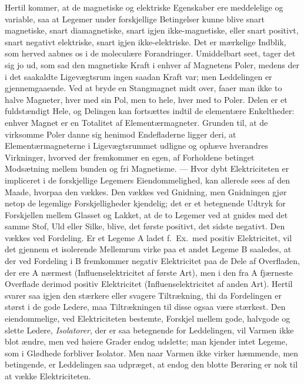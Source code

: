 \documentclass[12pt]{book}
\newcommand{\apage}[1]{\marginnote{\footnotesize\textit{[#1]}}}
\begin{document}
Hertil kommer, at de magnetiske og elektriske Egenskaber ere meddelelige og
variable, saa at  \apage{148} Legemer under forskjellige Betingelser kunne blive snart
magnetiske, snart diamagnetiske, snart igjen ikke-magnetiske, eller snart
positivt, snart negativt elektriske, snart igjen ikke-elektriske. Det er
mærkelige Indblik, som herved aabnes os i de moleculære Forandringer.
Umiddelbart seet, tager det sig jo ud, som sad den magnetiske Kraft i
enhver af Magnetens Poler, medens der i det saakaldte Ligevægtsrum ingen
saadan Kraft var; men Leddelingen er gjennemgaaende. Ved at bryde en
Stangmagnet midt over, faaer man ikke to halve Magneter, hver med sin Pol,
men to hele, hver med to Poler. Delen er et fuldstændigt Hele, og Delingen
kan fortsættes indtil de elementære Enkeltheder: enhver Magnet er en
Totalitet af Elementærmagneter. Grunden til, at de virksomme Poler danne
sig henimod Endefladerne ligger deri, at Elementærmagneterne i
Ligevægtsrummet udligne og ophæve hverandres Virkninger, hvorved der
fremkommer en egen, af Forholdene betinget Modsætning mellem bunden og fri
Magnetisme. --- Hvor dybt Elektriciteten er impliceret i de forskjellige
Legemers Eiendommelighed, kan allerede sees af den Maade, hvorpaa den
vækkes. Den vækkes ved Gnidning, men Gnidningen gjør netop de legemlige
Forskjelligheder kjendelig; det er et betegnende Udtryk for Forskjellen
mellem Glasset og Lakket, at de to Legemer ved at gnides med det samme
Stof, Uld eller Silke, blive, det første positivt, det sidste negativt. Den
vækkes ved Fordeling. Er et Legeme A ladet f.\ Ex.\ med positiv
Elektricitet, vil det gjennem et isolerende Mellemrum virke paa et andet
Legeme \apage{149} B saaledes, at der ved Fordeling i B fremkommer negativ Elektricitet
paa de Dele af Overfladen, der ere A nærmest (Influenselektricitet af
første Art), men i den fra A fjærneste Overflade derimod positiv
Elektricitet (Influenselektricitet af anden Art). Hertil svarer saa igjen
den stærkere eller svagere Tiltrækning, thi da Fordelingen er størst i de
gode Ledere, maa Tiltrækningen til disse ogsaa være stærkest. Den
eiendommelige, ved Elektriciteten bestemte, Forskjel mellem gode, halvgode
og slette Ledere, \emph{Isolatorer}, der er saa betegnende for Leddelingen, vil
Varmen ikke blot ændre, men ved høiere Grader endog udslette; man kjender
intet Legeme, som i Glødhede forbliver Isolator. Men naar Varmen ikke
virker hæmmende, men betingende, er Leddelingen saa udpræget, at endog den
blotte Berøring er nok til at vække Elektriciteten.
\end{document}
